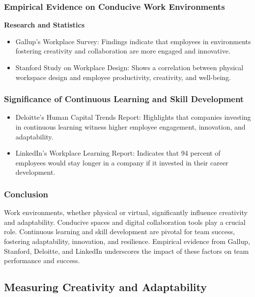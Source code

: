 \documentclass[a4paper, twoside]{article}
\begin{document}
\subsubsection{Empirical Evidence on Conducive Work Environments}

\textbf{Research and Statistics}
\begin{itemize}
    \item{Gallup's Workplace Survey:} Findings indicate that employees in environments fostering creativity and collaboration are more engaged and innovative.\cite{GallupWorkplace}
    \item{Stanford Study on Workplace Design:} Shows a correlation between physical workspace design and employee productivity, creativity, and well-being.\cite{StanfordWorkplace}
\end{itemize}

\subsubsection{Significance of Continuous Learning and Skill Development}
\begin{itemize}
    \item{Deloitte's Human Capital Trends Report:} Highlights that companies investing in continuous learning witness higher employee engagement, innovation, and adaptability.\cite{DeloitteHumanCapital}
    \item{LinkedIn's Workplace Learning Report:} Indicates that 94 percent of employees would stay longer in a company if it invested in their career development.\cite{LinkedInLearning}
\end{itemize}
\subsubsection{Conclusion}
Work environments, whether physical or virtual, significantly influence creativity and adaptability. Conducive spaces and digital collaboration tools play a crucial role. Continuous learning and skill development are pivotal for team success, fostering adaptability, innovation, and resilience. Empirical evidence from Gallup, Stanford, Deloitte, and LinkedIn underscores the impact of these factors on team performance and success.



\subsection{Measuring Creativity and Adaptability}
\end{document}
